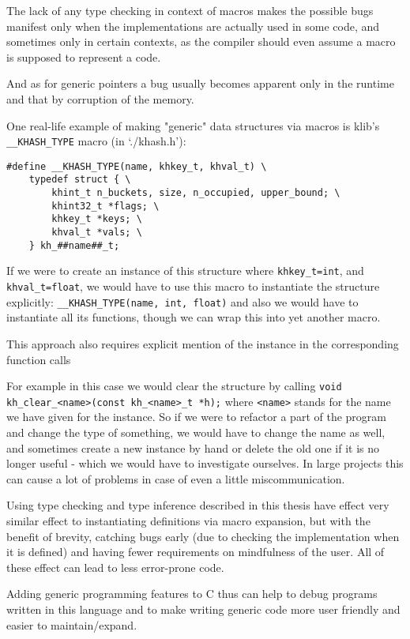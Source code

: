 The lack of any type checking in context of macros makes the possible bugs manifest only when the implementations are actually used in some code, and sometimes only in certain contexts, as the compiler should even assume a macro is supposed to represent a code.

And as for generic pointers a bug usually becomes apparent only in the runtime and that by corruption of the memory.

One real-life example of making "generic" data structures via macros is klib's \lstinline{__KHASH_TYPE} macro (in `./khash.h'): %

\begin{lstlisting}
#define __KHASH_TYPE(name, khkey_t, khval_t) \
	typedef struct { \
		khint_t n_buckets, size, n_occupied, upper_bound; \
		khint32_t *flags; \
		khkey_t *keys; \
		khval_t *vals; \
	} kh_##name##_t;
\end{lstlisting}

If we were to create an instance of this structure where \lstinline{khkey_t=int}, and \lstinline{khval_t=float}, we would have to use this macro to instantiate the structure explicitly: \lstinline{__KHASH_TYPE(name, int, float)} and also we would have to instantiate all its functions, though we can wrap this into yet another macro.

This approach also requires explicit mention of the instance in the corresponding function calls

For example in this case we would clear the structure by calling
\lstinline{void kh_clear_<name>(const kh_<name>_t *h);} where \lstinline{<name>} stands for the name we have given for the instance. So if we were to refactor a part of the program and change the type of something, we would have to change the name as well, and sometimes create a new instance by hand or delete the old one if it is no longer useful - which we would have to investigate ourselves. In large projects this can cause a lot of problems in case of even a little miscommunication.

Using type checking and type inference described in this thesis have effect very similar effect to instantiating definitions via macro expansion, but with the benefit of brevity, catching bugs early (due to checking the implementation when it is defined) and having fewer requirements on mindfulness of the user. All of these effect can lead to less error-prone code.

Adding generic programming features to C thus can help to debug programs written in this language and to make writing generic code more user friendly and easier to maintain/expand. %

